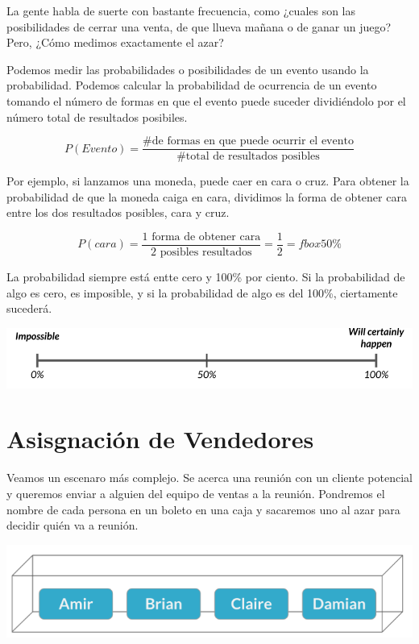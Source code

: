 \documentclass[
  letterpaper,
  DIV=11,
  numbers=noendperiod]{scrreprt}
\begin{document}
La gente habla de suerte con bastante frecuencia, como ¿cuales son las
posibilidades de cerrar una venta, de que llueva mañana o de ganar un
juego? Pero, ¿Cómo medimos exactamente el azar?

Podemos medir las probabilidades o posibilidades de un evento usando la
probabilidad. Podemos calcular la probabilidad de ocurrencia de un
evento tomando el número de formas en que el evento puede suceder
dividiéndolo por el número total de resultados posibiles.

\[
P(Evento) = \frac{\mbox{\# de formas en que puede ocurrir el evento}}{\mbox{\# total de resultados posibles}}
\]

Por ejemplo, si lanzamos una moneda, puede caer en cara o cruz. Para
obtener la probabilidad de que la moneda caiga en cara, dividimos la
forma de obtener cara entre los dos resultados posibles, cara y cruz.

\[
P(cara) = \frac{\mbox{1 forma de obtener cara}}{\mbox{2 posibles resultados}} = \frac{1}{2} = fbox{50\%}
\]

La probabilidad siempre está entte cero y 100\% por ciento. Si la
probabilidad de algo es cero, es imposible, y si la probabilidad de algo
es del 100\%, ciertamente sucederá.

\includegraphics{fig11.png}

\hypertarget{asisgnaciuxf3n-de-vendedores}{%
\section{Asisgnación de Vendedores}\label{asisgnaciuxf3n-de-vendedores}}

Veamos un escenaro más complejo. Se acerca una reunión con un cliente
potencial y queremos enviar a alguien del equipo de ventas a la reunión.
Pondremos el nombre de cada persona en un boleto en una caja y sacaremos
uno al azar para decidir quién va a reunión.

\includegraphics{fig12.png}
\end{document}
